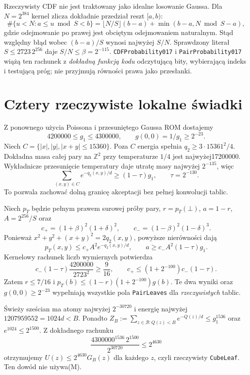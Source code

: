 \documentclass[11pt,a4paper]{article}
\newcommand{\code}[1]{\nolinkurl{#1}}
\begin{document}
Rzeczywisty CDF nie jest traktowany jako idealne losowanie Gaussa.
Dla $N=2^{384}$ kernel zlicza dokładnie przedział reszt $[a,b)$:
\[
 \#\{u<N:a\le u\bmod S<b\}
 =\lfloor N/S\rfloor(b-a)+\min(b-a,N\bmod S-a),
\]
gdzie odejmowanie po prawej jest obciętym odejmowaniem naturalnym.
Stąd względny błąd wobec $(b-a)/S$ wynosi najwyżej $S/N$.
Sprawdzony literał $S\le2723\,2^{256}$ daje $S/N\le\beta=2^{-115}$.
\code{CDFProbability017} i \code{PairProbability017} wiążą ten rachunek
z \emph{dokładną funkcją kodu} odczytującą bity, wybierającą indeks i
testującą próg; nie przyjmują równości prawa jako przesłanki.

\section{Cztery rzeczywiste lokalne świadki}
Z ponownego użycia Poissona i przesuniętego Gaussa ROM dostajemy
\[
 4200000\le g_1\le4300000,\qquad g(0,0)=1/g_1\ge2^{-23}.
\]
Niech $C=\{|x|,|y|,|x+y|\le15360\}$. Poza $C$ energia spełnia
$q_2\ge3\cdot15361^2/4$. Dokładna masa całej pary na $\mathbb Z^2$
przy temperaturze $1/4$ jest najwyżej17200000. Wykładnicze przesunięcie
temperatury daje utratę masy najwyżej $2^{-135}$, więc
\[
 \sum_{(x,y)\in C}e^{-q_2(x,y)/d}\ge(1-\tau)g_1,
 \qquad\tau=2^{-130}.
\]
To pozwala zachować dolną granicę akceptacji bez pełnej konwolucji tablic.

Niech $p_T$ będzie pełnym prawem surowej próby pary, $r=p_T(\bot)$,
$a=1-r$, $A=2^{256}/S$ oraz
\[
 c_+=(1+\beta)^2(1+\delta)^2,\qquad
 c_-=(1-\beta)^2(1-\delta)^3.
\]
Ponieważ $x^2+y^2+(x+y)^2=2q_2(x,y)$, powyższe nierówności dają
\[
 p_T(x,y)\le c_+A^2e^{-q_2(x,y)/d},\qquad
 a\ge c_-A^2(1-\tau)g_1.
\]
Kernelowy rachunek liczb wymiernych potwierdza
\[
 c_-(1-\tau)\frac{4200000}{2723^2}\ge\frac9{16},\qquad
 c_+\le(1+2^{-100})c_-(1-\tau).
\]
Zatem $r\le7/16$ i $p_T(b)\le(1-r)(1+2^{-100})g(b)$.
Te dwa wyniki oraz $g(0,0)\ge2^{-23}$ wypełniają wszystkie pola
\code{PairLeaves} dla \emph{rzeczywistych} tablic.

Świeży sześcian ma atomy najwyżej $2^{-30720}$ i energię najwyżej
$1207959552=1024d<B$. Ponadto $Z_B:=\sum_{z\in\mathcal B:Q(z)<B}e^{-Q(z)/d}\le g_1^{1536}$ oraz
$e^{1024}\le2^{1500}$. Z dokładnego rachunku
\[
 \frac{4300000^{1536}\,2^{1500}}{2^{30720}}\le2^{4630}
\]
otrzymujemy $U(z)\le2^{4630}G_B(z)$ dla każdego $z$, czyli rzeczywisty
\code{CubeLeaf}. Ten dowód nie używa(M).
\end{document}
